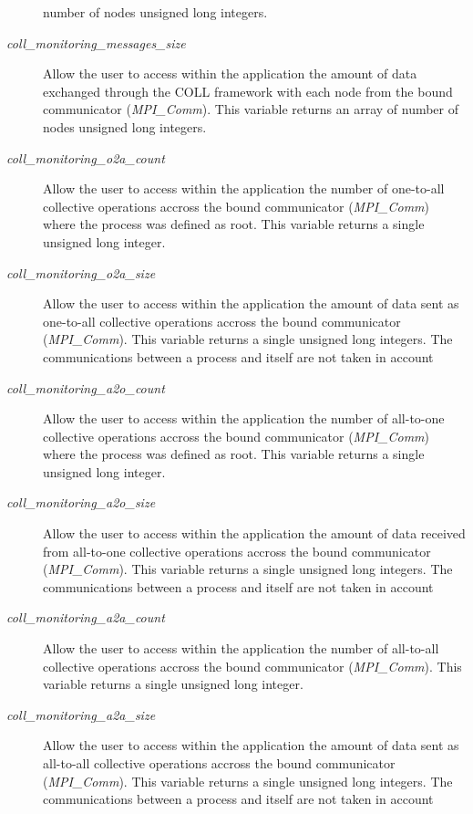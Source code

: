 \documentclass[notitlepage]{article}
\begin{document}
\begin{description}
  number of nodes unsigned long integers.
\item [\textit{coll\_monitoring\_messages\_size}] Allow the user to
  access within the application the amount of data exchanged through
  the COLL framework with each node from the bound communicator
  (\textit{MPI\_Comm}). This variable returns an array of number of
  nodes unsigned long integers.
\item [\textit{coll\_monitoring\_o2a\_count}] Allow the user to access
  within the application the number of one-to-all collective
  operations accross the bound communicator (\textit{MPI\_Comm}) where
  the process was defined as root. This variable returns a single
  unsigned long integer.
\item [\textit{coll\_monitoring\_o2a\_size}] Allow the user to access
  within the application the amount of data sent as one-to-all
  collective operations accross the bound communicator
  (\textit{MPI\_Comm}). This variable returns a single unsigned long
  integers. The communications between a process and itself are not
  taken in account
\item [\textit{coll\_monitoring\_a2o\_count}] Allow the user to access
  within the application the number of all-to-one collective
  operations accross the bound communicator (\textit{MPI\_Comm}) where
  the process was defined as root. This variable returns a single
  unsigned long integer.
\item [\textit{coll\_monitoring\_a2o\_size}] Allow the user to access
  within the application the amount of data received from all-to-one
  collective operations accross the bound communicator
  (\textit{MPI\_Comm}). This variable returns a single unsigned long
  integers. The communications between a process and itself are not
  taken in account
\item [\textit{coll\_monitoring\_a2a\_count}] Allow the user to access
  within the application the number of all-to-all collective
  operations accross the bound communicator (\textit{MPI\_Comm}). This
  variable returns a single unsigned long integer.
\item [\textit{coll\_monitoring\_a2a\_size}] Allow the user to access
  within the application the amount of data sent as all-to-all
  collective operations accross the bound communicator
  (\textit{MPI\_Comm}). This variable returns a single unsigned long
  integers. The communications between a process and itself are not
  taken in account
\end{description}
\end{document}
